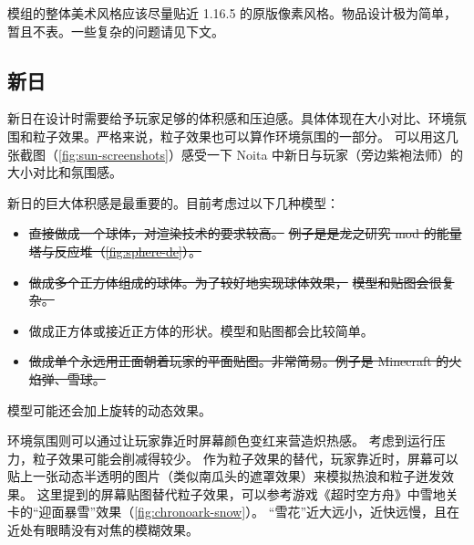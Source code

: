 \documentclass[11pt]{article}
\begin{document}
    模组的整体美术风格应该尽量贴近 1.16.5 的原版像素风格。物品设计极为简单，暂且不表。一些复杂的问题请见下文。

    \subsection{新日}\label{subsec:design-sun}

    新日在设计时需要给予玩家足够的体积感和压迫感。具体体现在大小对比、环境氛围和粒子效果。严格来说，粒子效果也可以算作环境氛围的一部分。
    可以用这几张截图（\ref{fig:sun-screenshots}）感受一下 Noita 中新日与玩家（旁边紫袍法师）的大小对比和氛围感。

    新日的巨大体积感是最重要的。目前考虑过以下几种模型：
    \begin{itemize}
        \item \sout{直接做成一个球体，对渲染技术的要求较高。}
                \sout{例子是是龙之研究 mod 的能量塔与反应堆（\ref{fig:sphere-de}）。}
        \item \sout{做成多个正方体组成的球体。为了较好地实现球体效果，}
                \sout{ 模型和贴图会很复杂。}
        \item 做成正方体或接近正方体的形状。模型和贴图都会比较简单。
        \item \sout{做成单个永远用正面朝着玩家的平面贴图。非常简易。例子是 Minecraft 的火焰弹、雪球。}
    \end{itemize}
    模型可能还会加上旋转的动态效果。

    环境氛围则可以通过让玩家靠近时屏幕颜色变红来营造炽热感。
    考虑到运行压力，粒子效果可能会削减得较少。
    作为粒子效果的替代，玩家靠近时，屏幕可以贴上一张动态半透明的图片（类似南瓜头的遮罩效果）来模拟热浪和粒子迸发效果。
    这里提到的屏幕贴图替代粒子效果，可以参考游戏《超时空方舟》中雪地关卡的“迎面暴雪”效果（\ref{fig:chronoark-snow}）。
    “雪花”近大远小，近快远慢，且在近处有眼睛没有对焦的模糊效果。
\end{document}
